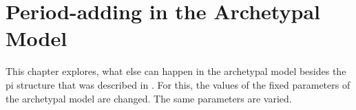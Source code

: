 \chapter{Period-adding in the Archetypal Model}
\label{chap:add}

This chapter explores, what else can happen in the archetypal model besides the \gls{pi} structure that was described in .
For this, the values of the fixed parameters of the archetypal model are changed.
The same parameters are varied.


\clearpage

\clearpage

